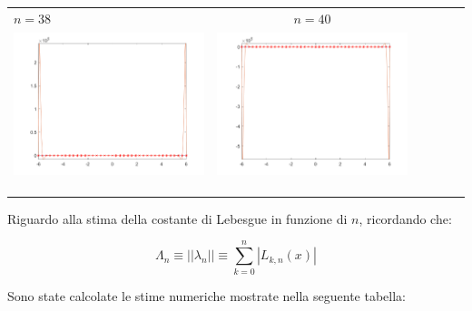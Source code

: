 \begin{tabular}{l*{5}{c}}
\hspace{3.5cm}\(n=38\) &  \(n=40\) \\
\includegraphics[scale=0.5]{cap4/4_9/38.png} &  \includegraphics[scale=0.5]{cap4/4_9/40.png} \\
& \\
& \\
& \\
\end{tabular}

\noindent Riguardo alla stima della costante di Lebesgue in funzione di \(n\), ricordando che:

\[
\Lambda_n \equiv ||\lambda_n|| \equiv \sum^n_{k=0}|L_{k,n}(x)|
\]

\noindent Sono state calcolate le stime numeriche mostrate nella seguente tabella:

